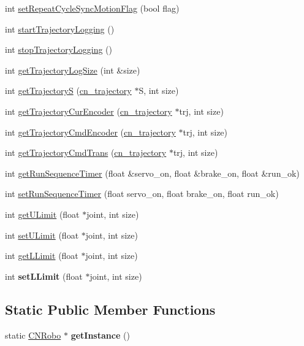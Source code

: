 \begin{DoxyCompactItemize}
int \hyperlink{classCNRobo_a7c2cfc569719b7e2ac1739e07b17a008}{set\-Repeat\-Cycle\-Sync\-Motion\-Flag} (bool flag)
\item 
int \hyperlink{classCNRobo_a6814066fdd61e3536f68709ca2716883}{start\-Trajectory\-Logging} ()
\item 
int \hyperlink{classCNRobo_a49d7f563a32292e6b7b20634a333d71c}{stop\-Trajectory\-Logging} ()
\item 
int \hyperlink{classCNRobo_a3c02d515222462eb1bc920858d0c533f}{get\-Trajectory\-Log\-Size} (int \&size)
\item 
int \hyperlink{classCNRobo_abdc84dec727d62379b5d3aabeaa92959}{get\-Trajectory\-S} (\hyperlink{structcn__trajectory}{cn\-\_\-trajectory} $\ast$S, int size)
\item 
int \hyperlink{classCNRobo_ad4cdd7cab36e0167b2137e45455a523b}{get\-Trajectory\-Cur\-Encoder} (\hyperlink{structcn__trajectory}{cn\-\_\-trajectory} $\ast$trj, int size)
\item 
int \hyperlink{classCNRobo_ad1361957f65f4ee65d079792d372bc4f}{get\-Trajectory\-Cmd\-Encoder} (\hyperlink{structcn__trajectory}{cn\-\_\-trajectory} $\ast$trj, int size)
\item 
int \hyperlink{classCNRobo_a7fcded29a1733f90558f6f8e360f1943}{get\-Trajectory\-Cmd\-Trans} (\hyperlink{structcn__trajectory}{cn\-\_\-trajectory} $\ast$trj, int size)
\item 
int \hyperlink{classCNRobo_ac3d244e2e0a171d7376bf23481c348ab}{get\-Run\-Sequence\-Timer} (float \&servo\-\_\-on, float \&brake\-\_\-on, float \&run\-\_\-ok)
\item 
int \hyperlink{classCNRobo_a431ca6e5f3cb74c29a625ccef14239ed}{set\-Run\-Sequence\-Timer} (float servo\-\_\-on, float brake\-\_\-on, float run\-\_\-ok)
\item 
int \hyperlink{classCNRobo_a3eb2e71138b880945a3b8de4def1ce96}{get\-U\-Limit} (float $\ast$joint, int size)
\item 
int \hyperlink{classCNRobo_a6670afae4db3d9104a728d1c11593087}{set\-U\-Limit} (float $\ast$joint, int size)
\item 
int \hyperlink{classCNRobo_afb1a7c8dfcdfb90050d3b6f64b033b55}{get\-L\-Limit} (float $\ast$joint, int size)
\item 
\hypertarget{classCNRobo_a004456bea9e60707f974a75c0be1869a}{int {\bfseries set\-L\-Limit} (float $\ast$joint, int size)}\label{classCNRobo_a004456bea9e60707f974a75c0be1869a}

\end{DoxyCompactItemize}
\subsection*{Static Public Member Functions}
\begin{DoxyCompactItemize}
\item 
\hypertarget{classCNRobo_a6af64e8756bee564eb80dafbe831c67b}{static \hyperlink{classCNRobo}{C\-N\-Robo} $\ast$ {\bfseries get\-Instance} ()}\label{classCNRobo_a6af64e8756bee564eb80dafbe831c67b}

\end{DoxyCompactItemize}
